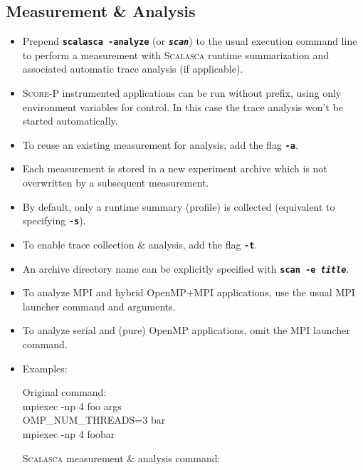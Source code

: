 \documentclass[a4paper]{article}
\newcommand{\Scalasca}{\textsc{Scalasca}\xspace}
\newcommand{\Scorep}{\textsc{Score-P}\xspace}
\begin{document}

\subsection*{Measurement \& Analysis}
\begin{itemize}
  \item Prepend \textbf{\texttt{scalasca -analyze}} (or \textbf{\texttt{\em scan}})
        to the usual execution command line to perform a measurement with
        \Scalasca runtime summarization and associated automatic trace analysis
        (if applicable).
  \item \Scorep instrumented applications can be run without prefix, using only 
        environment variables for control. In this case the trace analysis won't
        be started automatically.
  \item To reuse an existing measurement for analysis, add the flag \textbf{\texttt{-a}}.
  \item Each measurement is stored in a new experiment archive
        which is not overwritten by a subsequent measurement.
  \item By default, only a runtime summary (profile) is collected 
        (equivalent to specifying \textbf{\texttt{-s}}).
  \item To enable trace collection \& analysis, add the flag \textbf{\texttt{-t}}.
  \item An archive directory name can be explicitly specified with
        \textbf{\texttt{scan -e {\em title}}}.  
  \item To analyze MPI and hybrid OpenMP+MPI applications,
        use the usual MPI launcher command and arguments.
  \item To analyze serial and (pure) OpenMP applications, omit the MPI launcher
        command.
  \item Examples:\\
    \begin{minipage}[t]{0.255\linewidth}
      Original command: \\\ttfamily
      mpiexec -np 4 foo args \\
      OMP\_NUM\_THREADS=3 bar \\
      mpiexec -np 4 foobar
    \end{minipage}
    \begin{minipage}[t]{0.5\linewidth}
      \Scalasca measurement \& analysis command: \\\ttfamily

\end{minipage}
\end{itemize}
\end{document}
